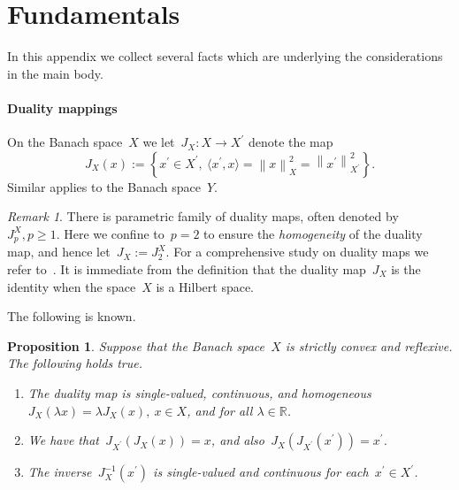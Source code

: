 \documentclass[12pt]{amsart}
\newcommand{\norm}[2]{\left\|#1\right\|_{#2}}
\newcommand{\scalar}[2]{\langle{ #1},{#2} \rangle}
\newcommand{\set}[1]{\left\{#1\right\}}
\newcommand{\real}{\mathbb R}
\newtheorem{proposition}{Proposition}%
\theoremstyle{remark}
\newtheorem{remark}{Remark}
\begin{document}
\appendix
 

\section{Fundamentals }
\label{sec:fundamentals}
In this appendix we collect several facts which are underlying the
considerations in the main body.
\paragraph{{\bf Duality mappings}}
On the Banach space~$X$ we let~$J_{X}\colon X \to X^{\prime}$ denote the
  map
  $$
J_{X}(x) := \set{x^{\prime}\in X^{\prime},\ \scalar{x^{\prime}}{x} =
  \norm{x}{X}^{2}= \norm{x^{\prime}}{X^{\prime}}^{2}}.
$$
Similar applies to the Banach space~$Y$.
\begin{remark}
  There is parametric family of duality maps, often denoted
  by~$J_{p}^{X}, p\geq 1$. Here we confine to~$p=2$ to ensure the
  \emph{homogeneity} of the duality map, and hence let~$J_{X}:= J_{2}^{X}$.
  For a comprehensive study on duality maps we refer to~\cite{MR1079061}. It is immediate from the definition that the duality map~$J_X$ is the identity when the space~$X$ is a Hilbert space.
\end{remark}
The following is known.
\begin{proposition}\label{prop:duality}
  Suppose that the Banach space~$X$ is strictly convex and reflexive.
  The following holds true.
  \begin{enumerate}
  \item The duality map is
    single-valued, continuous, and homogeneous
    $J_{X}(\lambda x) = \lambda  J_{X}(x),\ x\in X$, and for all $\lambda \in\real$.
  \item We have that~$J_{X^{\prime}}(J_{X}(x)) = x$, and
also~$J_{X}(J_{X^{\prime}}(x^{\prime}))= x^{\prime}$.
\item The inverse~$J_{X}^{-1}(x^{\prime})$ is single-valued and continuous for
  each~$x^{\prime}\in X^{\prime}$.
  \end{enumerate}
\end{proposition}
\end{document}
